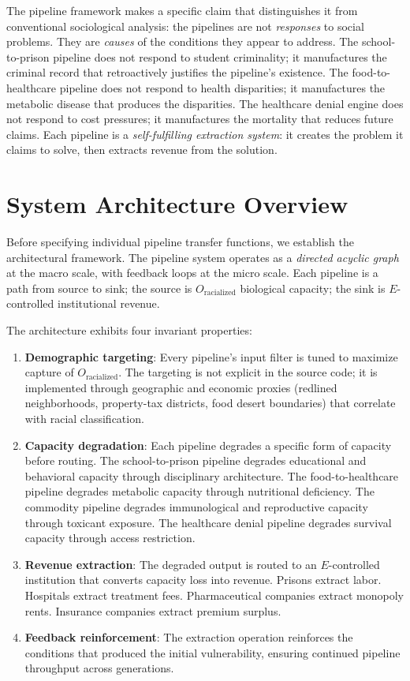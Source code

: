 The pipeline framework makes a specific claim that distinguishes it from conventional sociological analysis: the pipelines are not \textit{responses} to social problems. They are \textit{causes} of the conditions they appear to address. The school-to-prison pipeline does not respond to student criminality; it manufactures the criminal record that retroactively justifies the pipeline's existence. The food-to-healthcare pipeline does not respond to health disparities; it manufactures the metabolic disease that produces the disparities. The healthcare denial engine does not respond to cost pressures; it manufactures the mortality that reduces future claims. Each pipeline is a \textit{self-fulfilling extraction system}: it creates the problem it claims to solve, then extracts revenue from the solution.

\section{System Architecture Overview}
\label{sec:architecture_overview}

Before specifying individual pipeline transfer functions, we establish the architectural framework. The pipeline system operates as a \textit{directed acyclic graph} at the macro scale, with feedback loops at the micro scale. Each pipeline is a path from source to sink; the source is $O_{\text{racialized}}$ biological capacity; the sink is $E$-controlled institutional revenue.

The architecture exhibits four invariant properties:

\begin{enumerate}[leftmargin=2em]
    \item \textbf{Demographic targeting}: Every pipeline's input filter is tuned to maximize capture of $O_{\text{racialized}}$. The targeting is not explicit in the source code; it is implemented through geographic and economic proxies (redlined neighborhoods, property-tax districts, food desert boundaries) that correlate with racial classification.
    \item \textbf{Capacity degradation}: Each pipeline degrades a specific form of capacity before routing. The school-to-prison pipeline degrades educational and behavioral capacity through disciplinary architecture. The food-to-healthcare pipeline degrades metabolic capacity through nutritional deficiency. The commodity pipeline degrades immunological and reproductive capacity through toxicant exposure. The healthcare denial pipeline degrades survival capacity through access restriction.
    \item \textbf{Revenue extraction}: The degraded output is routed to an $E$-controlled institution that converts capacity loss into revenue. Prisons extract labor. Hospitals extract treatment fees. Pharmaceutical companies extract monopoly rents. Insurance companies extract premium surplus.
    \item \textbf{Feedback reinforcement}: The extraction operation reinforces the conditions that produced the initial vulnerability, ensuring continued pipeline throughput across generations.
\end{enumerate}

